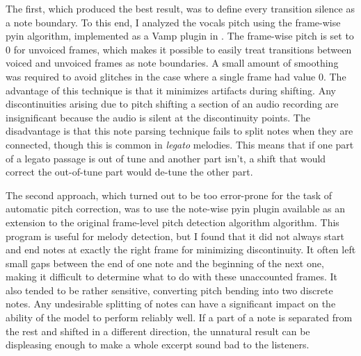 The first, which produced the best result, was to define every transition silence as a note boundary. To this end, I analyzed the vocals pitch using the frame-wise \gls{pyin} algorithm, implemented as a Vamp plugin in \cite{cannam2010sonic}. The frame-wise pitch is set to 0 for unvoiced frames, which makes it possible to easily treat transitions between voiced and unvoiced frames as note boundaries. A small amount of smoothing was required to avoid glitches in the case where a single frame had value 0. The advantage of this technique is that it minimizes artifacts during shifting. Any discontinuities arising due to pitch shifting a section of an audio recording are insignificant because the audio is silent at the discontinuity points. The disadvantage is that this note parsing technique fails to split notes when they are connected, though this is common in \textit{legato} melodies. This means that if one part of a legato passage is out of tune and another part isn't, a shift that would correct the out-of-tune part would de-tune the other part.

The second approach, which turned out to be too error-prone for the task of automatic pitch correction, was to use the note-wise \gls{pyin} plugin available as an extension to the original frame-level pitch detection algorithm algorithm. This program is useful for melody detection, but I found that it did not always start and end notes at exactly the right frame for minimizing discontinuity. It often left small gaps between the end of one note and the beginning of the next one, making it difficult to determine what to do with these unaccounted frames. It also tended to be rather sensitive, converting pitch bending into two discrete notes. Any undesirable splitting of notes can have a significant impact on the ability of the model to perform reliably well. If a part of a note is separated from the rest and shifted in a different direction, the unnatural result can be displeasing enough to make a whole excerpt sound bad to the listeners.

